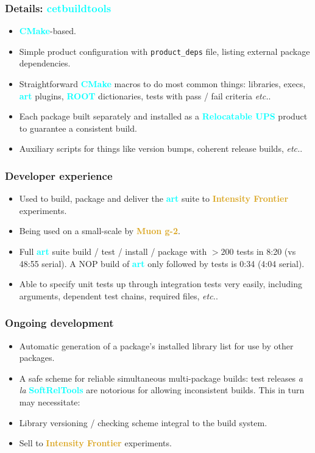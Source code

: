 \documentclass[xcolor={dvipsnames,table},c,compress,colorlinks]{beamer}
\newcommand{\productname}[1]{\textbf{\textcolor{cyan}{#1}}\xspace}
\newcommand{\cmd}[1]{\texttt{#1}\xspace}
\newcommand{\expt}[1]{\textbf{\textcolor{Goldenrod}{#1}}\xspace}
\newcommand{\art}{\productname{art}}
\newcommand{\IF}{\expt{Intensity Frontier}}
\newcommand{\etc}{\textit{etc.}}
\newcommand{\mg}{\expt{Muon g-2}}
\newcommand{\rootprod}{\productname{ROOT}}
\newcommand{\cmake}{\productname{CMake}}
\newcommand{\rups}{\productname{Relocatable UPS}}
\newcommand{\srt}{\productname{SoftRelTools}}
\begin{document}
\begin{frame}\frametitle{Details: \productname{cetbuildtools}}
  \begin{itemize}
  \item \cmake-based.
  \item Simple product configuration with \cmd{product\_deps} file,
    listing external package dependencies.
  \item Straightforward \cmake macros to do most common things:
    libraries, execs, \art plugins, \rootprod dictionaries, tests with
    pass / fail criteria \etc.
  \item Each package built separately and installed as a \rups product
    to guarantee a consistent build.
  \item Auxiliary scripts for things like version bumps, coherent
    release builds, \etc.
  \end{itemize}
\end{frame}

\begin{frame}\frametitle{Developer experience}
  \begin{itemize}
  \item Used to build, package and deliver the \art suite to \IF
    experiments.
  \item Being used on a small-scale by \mg.
  \item Full \art suite build / test / install / package with $>200$
    tests in 8:20 (vs 48:55 serial). A NOP build of \art only followed by
    tests is 0:34 (4:04 serial). 
  \item Able to specify unit tests up through integration tests very
    easily, including arguments, dependent test chains, required files,
    \etc.
  \end{itemize}
\end{frame}

\begin{frame}\frametitle{Ongoing development}
  \begin{itemize}
  \item Automatic generation of a package's installed library list for
    use by other packages.
  \item A safe scheme for reliable simultaneous multi-package
    builds: test releases \textit{a la} \srt are notorious for allowing
    inconsistent builds. This in turn may necessitate:
  \item Library versioning / checking scheme integral to the build
    system.
  \item Sell to \IF experiments.
  \end{itemize}
\end{frame}
\end{document}
